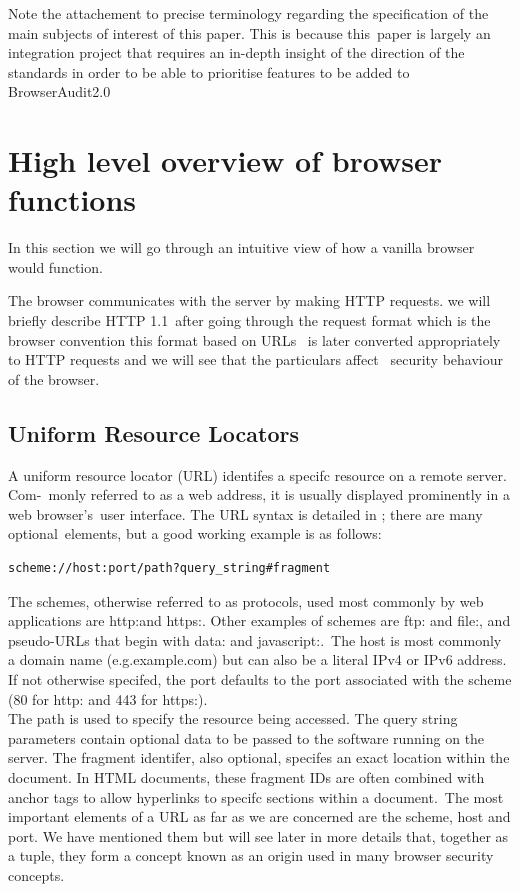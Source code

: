Note the attachement to precise terminology regarding the specification of the main subjects of interest of this paper. This is because this\ 
paper is largely an integration project that requires an in-depth insight of the direction of the standards in order to be able to prioritise features to be added to BrowserAudit2.0\

\section{High level overview of browser functions}

In this section we will go through an intuitive view of how a vanilla browser would function.\

The browser communicates with the server by making HTTP requests. we will briefly describe HTTP 1.1\
after going through the request format which is the browser convention this format based on URLs \
is later converted appropriately to HTTP requests and we will see that the particulars affect \
security behaviour of the browser.\

\subsection{Uniform Resource Locators}

A uniform resource locator (URL) identifes a specifc resource on a remote server. Com-\
monly referred to as a web address, it is usually displayed prominently in a web browser's\
user interface. The URL syntax is detailed in \cite{URL}; there are many optional\
elements, but a good working example is as follows:\\

\begin{verbatim}
scheme://host:port/path?query_string#fragment
\end{verbatim}

The schemes, otherwise referred to as protocols, used most commonly by web applications
are http:and https:. Other examples of schemes are ftp: and file:, and pseudo-URLs that begin with
data: and javascript:.\
The host is most commonly a domain name (e.g.example.com) but can also be a literal
IPv4 or IPv6 address. If not otherwise specifed, the port defaults to the port associated
with the scheme (80 for http: and 443 for https:).\\

The path is used to specify the resource being accessed. The query string parameters
contain optional data to be passed to the software running on the server. The fragment
identifer, also optional, specifes an exact location within the document. In HTML
documents, these fragment IDs are often combined with anchor tags to allow hyperlinks
to specifc sections within a document.\
The most important elements of a URL as far as we are concerned are the scheme, host
and port. We have mentioned them but will see later in more details that, together as a tuple, they form a concept known as
an origin used in many browser security concepts.\\

